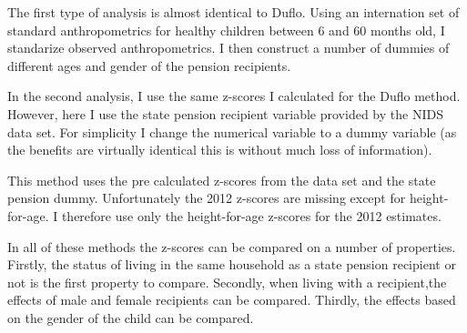 \documentclass[a4paper]{report}
\begin{document}
\begin{refsection}
The first type of analysis is almost identical to Duflo.
Using an internation set of standard anthropometrics for healthy children between 6 and 60 months old, I standarize observed anthropometrics.
I then construct a number of dummies of different ages and gender of the pension recipients.

In the second analysis, I use the same z-scores I calculated for the Duflo method.
However, here I use the state pension recipient variable provided by the NIDS data set.
For simplicity I change the numerical variable to a dummy variable (as the benefits are virtually identical this is without much loss of information).

This method uses the pre calculated z-scores from the data set and the state pension dummy.
Unfortunately the 2012 z-scores are missing except for height-for-age.
I therefore use only the height-for-age z-scores for the 2012 estimates.

In all of these methods the z-scores can be compared on a number of properties.
Firstly, the status of living in the same household as a state pension recipient or not is the first property to compare.
Secondly, when living with a recipient,the effects of male and female recipients can be compared.
Thirdly, the effects based on the gender of the child can be compared.

\printbibliography
\end{refsection}

% 


\end{document}
